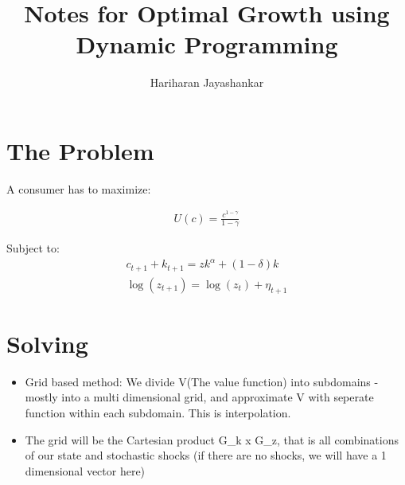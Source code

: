 \documentclass{article}
\title{Notes for Optimal Growth using Dynamic Programming}
\author{Hariharan Jayashankar}
\begin{document}
\maketitle

\section{The Problem}

A consumer has to maximize:

\begin{align}
  U(c) = \frac{c^{1 - \gamma}}{1 - \gamma}
\end{align}

Subject to:
\begin{align}
  c_{t+1} + k_{t+1} = zk^{\alpha} + (1 - \delta)k \\
  \log(z_{t+1}) = \log(z_t) + \eta_{t+1}
\end{align}

\section{Solving}

\begin{itemize}
  \item Grid based method: We divide V(The value function) into subdomains - mostly into a multi dimensional grid, and approximate V with seperate function within each subdomain. This is interpolation.
  \item The grid will be the Cartesian product G_k x G_z, that is all combinations of our state and stochastic shocks (if there are no shocks, we will have a 1 dimensional vector here) 
\end{itemize}
\end{document}
